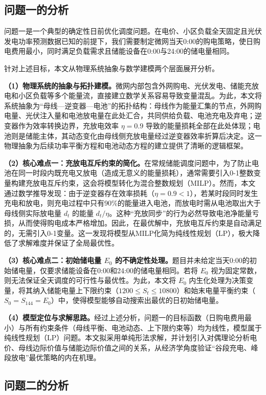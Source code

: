 \documentclass[withoutpreface,bwprint]{cumcmthesis} %
\begin{document}
\subsection{问题一的分析}

问题一是一个典型的确定性日前优化调度问题。在电价、小区负载全天固定且光伏发电功率预测数据已知的前提下，我们需要制定微网当天0:00的购电策略，使日购电费用最小，同时满足负载需求且储能设备在0:00与24:00的储电量相同。

针对上述目标，本文从物理系统抽象与数学建模两个层面展开分析。

\textbf{（1）物理系统的抽象与拓扑建模。}微网内部包含外网购电、光伏发电、储能充放电和小区负载等多个能量流，直接建立数学关系容易导致变量混乱。为此，本文将系统抽象为“母线—逆变器—电池”的拓扑结构：母线作为能量汇集的节点，外网购电量、光伏注入量和电池放电量在此处汇合，共同供给负载、电池充电及弃电；逆变器作为效率转换边界，充放电效率 \(\eta=0.9\) 导致的能量损耗全部在此处体现；电池则是储能主体，其动态变化由母线侧充放电量经过逆变器效率折算后决定。这一物理抽象为后续功率平衡方程和电池动态方程的建立提供了清晰的逻辑框架。

\textbf{（2）核心难点一：充放电互斥约束的简化。}在常规储能调度问题中，为了防止电池在同一时段内既充电又放电（造成无意义的能量损耗），通常需要引入0-1整数变量构建充放电互斥约束，这会将模型转化为混合整数规划（MILP）。然而，本文通过数学推导发现：由于逆变器存在效率损耗（\(\eta=0.9 < 1\)），若某时段同时发生充电和放电，则充电过程中只有90\%的能量进入电池，而放电时需从电池取出大于母线侧实际放电量 \(d_t\) 的能量 \(d_t/\eta\)。这种“充放同步”的行为必然导致电池净能量亏损，从而使得购电成本严格增加。因此，在最优解中，充放电互斥约束是自动满足的，无需引入0-1变量。这一发现将模型从MILP化简为纯线性规划（LP），极大降低了求解难度并保证了全局最优性。

\textbf{（3）核心难点二：初始储电量 \(E_0\) 的不确定性处理。}题目并未给定当天0:00的初始储电量，仅要求储能设备在0:00和24:00的储电量相同。若将 \(E_0\) 视为固定常数，则无法保证全天调度的可行性与最优性。为此，本文将 \(E_0\) 内生化处理为决策变量，将其纳入储能电量上下限约束（\(1200 \le S_t \le 10800\)）和始末电量平衡约束（\(S_0 = S_{144} = E_0\)）中，使得模型能够自动搜索出最优的日初始储电量。

\textbf{（4）模型定位与求解思路。}经过上述分析，问题一的目标函数（日购电费用最小）与所有约束条件（母线平衡、电池动态、上下限约束等）均为线性，模型属于纯线性规划（LP）问题。本文拟采用单纯形法求解，并计划引入对偶理论分析电价、母线边际价值与储能边际价值之间的关系，从经济学角度验证“谷段充电、峰段放电”最优策略的内在机理。
\subsection{问题二的分析}
\end{document}

